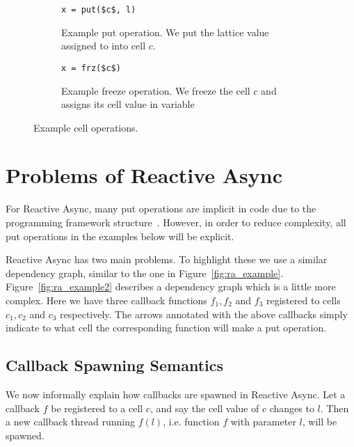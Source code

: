 \begin{figure}
  \centering
  \begin{subfigure}[t]{0.4\textwidth}
    \begin{lstlisting}[numbers=none,mathescape=true]
x = put($c$, l)
    \end{lstlisting}
    \caption{Example put operation. We put the lattice value assigned to  into
    cell $c$.}
  \end{subfigure}
  \quad
  \begin{subfigure}[t]{0.4\textwidth}
    \begin{lstlisting}[numbers=none,mathescape=true]
x = frz($c$)
    \end{lstlisting}
    \caption{Example freeze operation. We freeze the cell $c$ and assigns its cell
    value in variable }
  \end{subfigure}
  \caption{Example cell operations.}
  \label{fig:ex_cell_op}
\end{figure}

\section{Problems of Reactive Async}%
\label{sec:problems_of_reactive_async}

For Reactive Async, many put operations are implicit in code due to the
programming framework structure~\parencite{conf/scala/HallerGES16}. However, in
order to reduce complexity, all put operations in the examples below will be
explicit.

Reactive Async has two main problems. To highlight these we use a similar
dependency graph, similar to the one in Figure~\ref{fig:ra_example}.
Figure~\ref{fig:ra_example2} describes a dependency graph which is a little more
complex. Here we have three callback functions $f_1, f_2$ and $f_3$ registered
to cells $c_1, c_2$ and $c_3$ respectively. The arrows annotated with the above
callbacks simply indicate to what cell the corresponding function will make a
put operation.

\subsection{Callback Spawning Semantics}%
\label{sub:callback_spawning_semantics_ra}

We now informally explain how callbacks are spawned in Reactive Async.  Let a
callback $f$ be registered to a cell $c$, and say the cell value of $c$ changes
to $l$. Then a new callback thread running $f(l)$, i.e. function $f$ with
parameter $l$, will be spawned.

